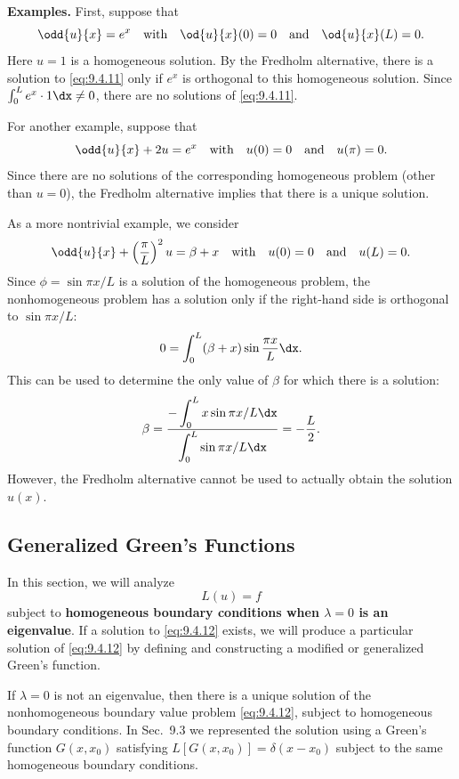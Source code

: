 \textbf{Examples.}
First, suppose that
\begin{equation}
\label{eq:9.4.11}
\odd{u}{x} = e^x \quad\text{with}\quad \od{u}{x}(0) = 0 \quad\text{and}\quad \od{u}{x}(L) = 0.
\end{equation}
Here $u = 1$ is a homogeneous solution.  By the Fredholm alternative, there is a solution to \eqref{eq:9.4.11} only if $e^x$ is orthogonal to this homogeneous solution.  Since $\int_0^L e^x \cdot 1\dx \neq 0$, there are no solutions of \eqref{eq:9.4.11}.

For another example, suppose that
\[
\odd{u}{x} + 2u = e^x \quad\text{with}\quad u(0) = 0 \quad\text{and}\quad u(\pi) = 0.
\]
Since there are no solutions of the corresponding homogeneous problem (other than $u=0$), the Fredholm alternative implies that there is a unique solution.

As a more nontrivial example, we consider
\[
\odd{u}{x} + \left(\frac{\pi}{L}\right)^2 u = \beta + x \quad\text{with}\quad u(0) = 0 \quad\text{and}\quad u(L) = 0.
\]
Since $\phi = \sin\pi x/L$ is a solution of the homogeneous problem, the nonhomogeneous problem has a solution only if the right-hand side is orthogonal to $\sin\pi x/L$:
\[
0 = \int_0^L (\beta + x)\sin\frac{\pi x}{L}\dx.
\]
This can be used to determine the only value of $\beta$ for which there is a solution:
\[
\beta = \frac{-\displaystyle\int_0^L x\sin\pi x/L\dx}{\displaystyle\int_0^L\sin\pi x/L\dx} = -\frac{L}{2}.
\]
However, the Fredholm alternative cannot be used to actually obtain the solution $u(x)$.

\subsection{Generalized Green's Functions}
\label{sec:gen-greens-fn}

In this section, we will analyze
\begin{equation}
\label{eq:9.4.12}
\boxed{L(u) = f}
\end{equation}
subject to \textbf{homogeneous boundary conditions when $\lambda = 0$ is an eigenvalue}.  If a solution to \eqref{eq:9.4.12} exists, we will produce a particular solution of \eqref{eq:9.4.12} by defining and constructing a modified or generalized Green's function.

If $\lambda = 0$ is not an eigenvalue, then there is a unique solution of the nonhomogeneous boundary value problem \eqref{eq:9.4.12}, subject to homogeneous boundary conditions.  In Sec.~9.3 we represented the solution using a Green's function $G(x,x_0)$ satisfying $L[G(x,x_0)] = \delta(x - x_0)$ subject to the same homogeneous boundary conditions.

